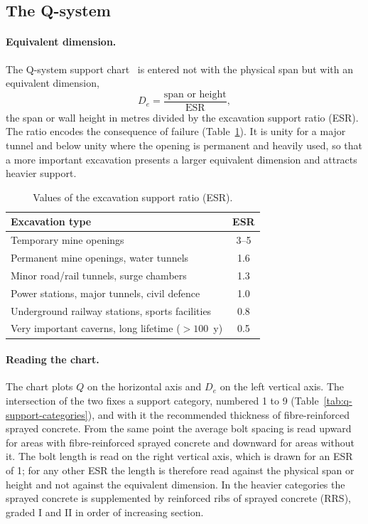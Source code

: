 \subsection{The Q-system}
\label{sec:q-support-design}

\paragraph{Equivalent dimension.}
The Q-system support chart~\citep{barton1974q,barton1994qsystem} is entered
not with the physical span but with an equivalent dimension,
\[
D_e = \frac{\text{span or height}}{\text{ESR}} ,
\]
the span or wall height in metres divided by the excavation support ratio
(ESR). The ratio encodes the consequence of failure
(Table~\ref{tab:esr}). It is unity for a major tunnel and below unity where
the opening is permanent and heavily used, so that a more important
excavation presents a larger equivalent dimension and attracts heavier
support.

\begin{table}[htbp]
\caption{Values of the excavation support ratio (ESR).}
\label{tab:esr}
\centering
\small
\begin{tabularx}{\textwidth}{X c}
\toprule
\textbf{Excavation type} & \textbf{ESR} \\
\midrule
Temporary mine openings & 3--5 \\
Permanent mine openings, water tunnels & 1.6 \\
Minor road/rail tunnels, surge chambers & 1.3 \\
Power stations, major tunnels, civil defence & 1.0 \\
Underground railway stations, sports facilities & 0.8 \\
Very important caverns, long lifetime ($>100$~y) & 0.5 \\
\bottomrule
\end{tabularx}
\end{table}

\paragraph{Reading the chart.}
The chart plots $Q$ on the horizontal axis and $D_e$ on the left vertical
axis. The intersection of the two fixes a support category, numbered 1 to 9
(Table~\ref{tab:q-support-categories}), and with it the recommended thickness
of fibre-reinforced sprayed concrete. From the same point the average bolt
spacing is read upward for areas with fibre-reinforced sprayed concrete and
downward for areas without it. The bolt length is read on the right vertical
axis, which is drawn for an ESR of 1; for any other ESR the length is
therefore read against the physical span or height and not against the
equivalent dimension. In the heavier categories the sprayed concrete is
supplemented by reinforced ribs of sprayed concrete (RRS), graded I and II in
order of increasing section.

